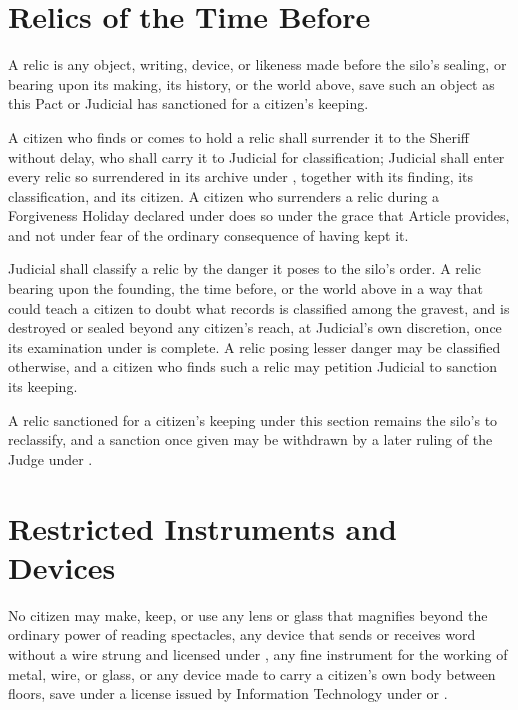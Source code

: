 \section{Relics of the Time Before}
\label{sec:publicorder:relics-of-the-time-before}

A relic is any object, writing, device, or likeness made before the silo's sealing, or bearing upon its making, its history, or the world above, save such an object as this Pact or Judicial has sanctioned for a citizen's keeping.

\begin{clauses}
\item A citizen who finds or comes to hold a relic shall surrender it to the Sheriff without delay, who shall carry it to Judicial for classification; Judicial shall enter every relic so surrendered in its archive under , together with its finding, its classification, and its citizen. A citizen who surrenders a relic during a Forgiveness Holiday declared under  does so under the grace that Article provides, and not under fear of the ordinary consequence of having kept it.
\item Judicial shall classify a relic by the danger it poses to the silo's order. A relic bearing upon the founding, the time before, or the world above in a way that could teach a citizen to doubt what  records is classified among the gravest, and is destroyed or sealed beyond any citizen's reach, at Judicial's own discretion, once its examination under  is complete. A relic posing lesser danger may be classified otherwise, and a citizen who finds such a relic may petition Judicial to sanction its keeping.
\item A relic sanctioned for a citizen's keeping under this section remains the silo's to reclassify, and a sanction once given may be withdrawn by a later ruling of the Judge under .
\end{clauses}

\section{Restricted Instruments and Devices}
\label{sec:publicorder:restricted-instruments-and-devices}

No citizen may make, keep, or use any lens or glass that magnifies beyond the ordinary power of reading spectacles, any device that sends or receives word without a wire strung and licensed under , any fine instrument for the working of metal, wire, or glass, or any device made to carry a citizen's own body between floors, save under a license issued by Information Technology under  or .

